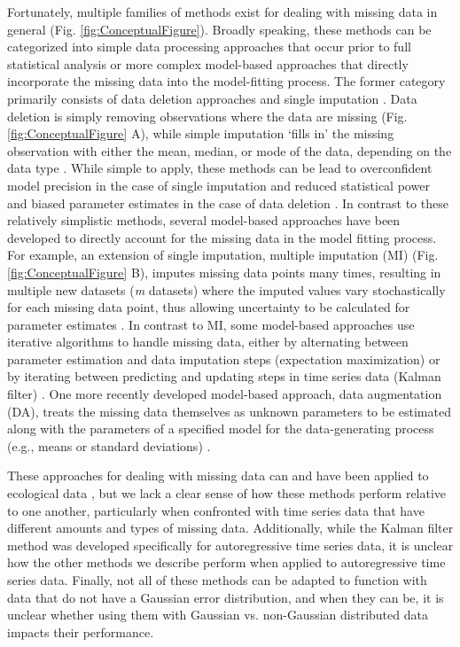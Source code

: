 \documentclass{article}
\begin{document}
Fortunately, multiple families of methods exist for dealing with missing data in general (Fig. \ref{fig:ConceptualFigure}). Broadly speaking, these methods can be categorized into simple data processing approaches that occur prior to full statistical analysis or more complex model-based approaches that directly incorporate the missing data into the model-fitting process. The former category primarily consists of data deletion approaches and single imputation \citep{nakagawa_model_2011}. Data deletion is simply removing observations where the data are missing (Fig. \ref{fig:ConceptualFigure} A), while simple imputation `fills in' the missing observation with either the mean, median, or mode of the data, depending on the data type \citep{kang2013prevention, nakagawa_missing_2015, onkelinx_working_2017}. While simple to apply, these methods can be lead to overconfident model precision in the case of single imputation \citep{fichman2003multiple, nakagawa_model_2011, aleryani2018dealing} and reduced statistical power and biased parameter estimates in the case of data deletion \citep{nakagawa_model_2011, aleryani2018dealing}. In contrast to these relatively simplistic methods, several model-based approaches have been developed to directly account for the missing data in the model fitting process. For example, an extension of single imputation, multiple imputation (MI) (Fig. \ref{fig:ConceptualFigure} B), imputes missing data points many times, resulting in multiple new datasets (\textit{m} datasets) where the imputed values vary stochastically for each missing data point, thus allowing uncertainty to be calculated for parameter estimates \citep{rubin1996multiple, rubin1988overview, nakagawa_model_2011, nakagawa_missing_2015}. In contrast to MI, some model-based approaches use iterative algorithms to handle missing data, either by alternating between parameter estimation and data imputation steps (expectation maximization) \citep{nadjafi2022expectation,li2019expectation, kang2013prevention} or by iterating between predicting and updating steps in time series data (Kalman filter) \citep{kalman_filter_1960}. One more recently developed model-based approach, data augmentation (DA), treats the missing data themselves as unknown parameters to be estimated along with the parameters of a specified model for the data-generating process (e.g., means or standard deviations) \citep{kong_sequential_1994}. 

 These approaches for dealing with missing data can and have been applied to ecological data \citep{Newman2023, Soldaat2007}, but we lack a clear sense of how these methods perform relative to one another, particularly when confronted with time series data that have different amounts and types of missing data. Additionally, while the Kalman filter method was developed specifically for autoregressive time series data, it is unclear how the other methods we describe perform when applied to autoregressive time series data. Finally, not all of these methods can be adapted to function with data that do not have a Gaussian error distribution, and when they can be, it is unclear whether using them with Gaussian vs. non-Gaussian distributed data impacts their performance.
\end{document}
